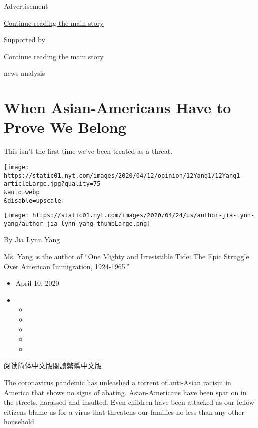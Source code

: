 Advertisement

\protect\hyperlink{after-top}{Continue reading the main story}

Supported by

\protect\hyperlink{after-sponsor}{Continue reading the main story}

news analysis

\hypertarget{when-asian-americans-have-to-prove-we-belong}{%
\section{When Asian-Americans Have to Prove We
Belong}\label{when-asian-americans-have-to-prove-we-belong}}

This isn't the first time we've been treated as a threat.

\texttt{[image: https://static01.nyt.com/images/2020/04/12/opinion/12Yang1/12Yang1-articleLarge.jpg?quality=75\\\&auto=webp\\\&disable=upscale]}

\texttt{[image: https://static01.nyt.com/images/2020/04/24/us/author-jia-lynn-yang/author-jia-lynn-yang-thumbLarge.png]}

By Jia Lynn Yang

Ms. Yang is the author of ``One Mighty and Irresistible Tide: The Epic
Struggle Over American Immigration, 1924-1965.''

\begin{itemize}
\item
  April 10, 2020
\item
  \begin{itemize}
  \item
  \item
  \item
  \item
  \item
  \end{itemize}
\end{itemize}

\href{https://cn.nytimes.com/opinion/20200420/coronavirus-asian-racism/}{阅读简体中文版}\href{https://cn.nytimes.com/opinion/20200420/coronavirus-asian-racism/zh-hant/}{閱讀繁體中文版}

The
\href{https://www.nytimes.com/2020/06/02/us/politics/african-americans-china-coronavirus.html}{coronavirus}
pandemic has unleashed a torrent of anti-Asian
\href{https://www.nytimes.com/2020/06/02/us/politics/african-americans-china-coronavirus.html}{racism}
in America that shows no signs of abating. Asian-Americans have been
spat on in the streets, harassed and insulted. Even children have been
attacked as our fellow citizens blame us for a virus that threatens our
families no less than any other household.

